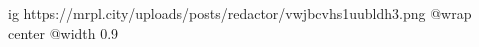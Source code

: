  
 
 
 
 

\ifcmt
  ig https://mrpl.city/uploads/posts/redactor/vwjbcvhs1uubldh3.png
  @wrap center
  @width 0.9
\fi
